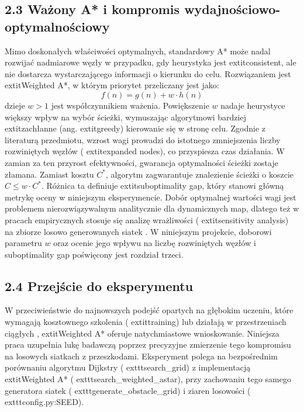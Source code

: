 \documentclass[conference]{IEEEtran}
\begin{document}
\subsection{2.3 Ważony A* i kompromis wydajnościowo-optymalnościowy}
Mimo doskonałych właściwości optymalnych, standardowy A* może nadal rozwijać nadmiarowe węzły w przypadku, gdy heurystyka jest 	extit{consistent}, ale nie dostarcza wystarczającego informacji o kierunku do celu. Rozwiązaniem jest 	extit{Weighted A*}, w którym priorytet przeliczany jest jako:
\begin{equation}
    f(n) = g(n) + w \cdot h(n)
\end{equation}
dzieje $w > 1$ jest współczynnikiem ważenia. Powiększenie $w$ nadaje heurystyce większy wpływ na wybór ścieżki, wymuszając algorytmowi bardziej 	extit{zachłanne} (ang. 	extit{greedy}) kierowanie się w stronę celu. Zgodnie z literaturą przedmiotu, wzrost wagi prowadzi do istotnego zmniejszenia liczby rozwiniętych węzłów (	extit{expanded nodes}), co przyspiesza czas działania\cite{abbasov2025optimal}. W zamian za ten przyrost efektywności, gwarancja optymalności ścieżki zostaje złamana. Zamiast kosztu $C^*$, algorytm zagwarantuje znalezienie ścieżki o koszcie $C \le w \cdot C^*$. Różnica ta definiuje 	extit{suboptimality gap}, który stanowi główną metrykę oceny w niniejszym eksperymencie.\n
Dobór optymalnej wartości wagi jest problemem nierozwiązywalnym analitycznie dla dynamicznych map, dlatego też w pracach empirycznych stosuje się analizę wrażliwości (	extit{sensitivity analysis}) na zbiorze losowo generowanych siatek \cite{bokan2024slope}. W niniejszym projekcie, doborowi parametru $w$ oraz ocenie jego wpływu na liczbę rozwiniętych węzłów i suboptimality gap poświęcony jest rozdział trzeci.\n
\subsection{2.4 Przejście do eksperymentu}
W przeciwieństwie do najnowszych podejść opartych na głębokim uczeniu, które wymagają kosztownego szkolenia (	extit{training}) lub działają w przestrzeniach ciągłych \cite{zhao2026customizable}, 	extit{Weighted A*} oferuje natychmiastowe wnioskowanie. Niniejsza praca uzupełnia lukę badawczą poprzez precyzyjne zmierzenie tego kompromisu na losowych siatkach z przeszkodami. Eksperyment polega na bezpośrednim porównaniu algorytmu Dijkstry (	exttt{search\_grid}) z implementacją 	extit{Weighted A*} (	exttt{search\_weighted\_astar}), przy zachowaniu tego samego generatora siatek (	exttt{generate\_obstacle\_grid}) i ziaren losowości (	exttt{config.py:SEED}).
\end{document}
